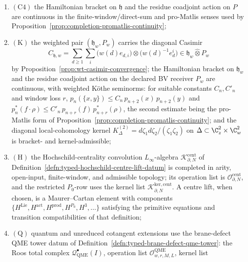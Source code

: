 \documentclass[11pt]{memoir}
\begin{document}
\begin{thm}
\begin{enumerate}[label=\textup{(\roman*)}]
      \((\mathfrak h,P)\) carries the residue pairing but not the
      infinite diagonal Casimir;
    \item \(\mathrm{(C4)}\) the Hamiltonian bracket on \(\mathfrak h\)
      and the residue coadjoint action on \(P\) are continuous in the
      finite-window/direct-sum and pro-Matlis senses used by
      Proposition~\ref{prop:completion-promatlis-continuity};
    \item \(\mathrm{(K)}\) the weighted pair
      \((\mathfrak h_w,P_w)\) carries the diagonal Casimir
      \[
        C_{\mathfrak h,w}
        =\sum_{d\ge1}\sum_i
        \bigl(w(d)e_{d,i}\bigr)\otimes
        \bigl(w(d)^{-1}e^i_d\bigr)
        \in \mathfrak h_w\widehat\otimes P_w
      \]
      by Proposition~\ref{prop:wt-casimir-convergence}; the Hamiltonian
      bracket on \(\mathfrak h_w\) and the residue coadjoint action on
      the declared BV receiver \(P_w\) are continuous, with weighted
      Köthe seminorms: for suitable constants \(C_n,C'_n\) and window
      loss \(r\),
      $p_n(\{x,y\})\leq C_n\,p_{n+2}(x)\,p_{n+2}(y)$ and
      \(p^*_n(f\cdot\rho)\leq C'_n\,p_{n+r}(f)\,p^*_{n+r}(\rho)\), the
      second estimate being the pro-Matlis form of
      Proposition~\ref{prop:completion-promatlis-continuity}; and the
      diagonal local-cohomology kernel
      $K^{(2)}_\Delta=d\zeta_1d\zeta_2/(\zeta_1\zeta_2)$ on
      $\Delta\subset\C^2_z\times\C^2_w$ is bracket- and
      kernel-admissible;
    \item \(\mathrm{(H)}\) the Hochschild-centrality convolution
      \(L_\infty\)-algebra
      \(\mathcal K^{\mathrm{cent}}_{\partial,N}\) of
      Definition~\ref{defn:typed-hochschild-centre-lift-datum} is
      completed in arity, open-input, finite-window, and admissible
      topology; its operation list is
      \(\mathcal O^{\mathrm{cent}}_{\partial,N}\), and the restricted
      \(P_0\)-row uses the kernel list
      \(\mathcal K^{\mathrm{ker,cent}}_{\partial,N}\).  A centre lift,
      when chosen, is a Maurer--Cartan element with components
      \(\{H^{\mathrm{Lie}},H^{\mathrm{act}},H^{\mathrm{prod}},
      H^{P_0},H^3,\ldots\}\) satisfying the primitive equations and
      transition compatibilities of that definition;
    \item \(\mathrm{(Q)}\) quantum and unreduced cotangent extensions use
      the brane-defect QME tower datum of
      Definition~\ref{defn:typed-brane-defect-qme-tower}: the Roos total
      complex \(\mathcal Q^\bullet_{\mathrm{QME}}(I)\), operation list
      \(\mathcal O^{\mathrm{QME}}_{w,r,M,L}\), kernel list

\end{enumerate}
\end{thm}
\end{document}
